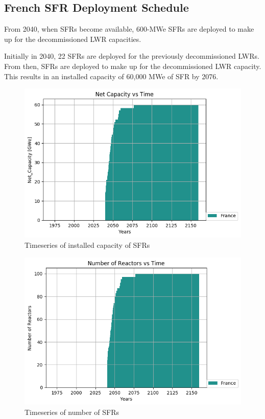 \subsection{French \gls{SFR} Deployment Schedule}

From 2040, when \gls{SFR}s become available,
600-MWe \gls{SFR}s are deployed to make up for the 
decommissioned \gls{LWR} capacities.

Initially in 2040, 22 \gls{SFR}s
are deployed for the previously decommissioned
\gls{LWR}s. From then, \glspl{SFR} are deployed to
make up for the decommissioned \gls{LWR} capacity.
This results in an installed capacity of 60,000 MWe
of \gls{SFR} by 2076.

\begin{figure}[htbp!]
        \begin{center}
                \includegraphics[scale=0.7]{./images/french-transition/power_plot.png}
        \end{center}
        \caption{Timeseries of installed capacity of \gls{SFR}s}
        \label{fig:sfr_cap}
\end{figure}


\begin{figure}[htbp!]
        \begin{center}
                \includegraphics[scale=0.7]{./images/french-transition/number_plot.png}
        \end{center}
        \caption{Timeseries of number of \gls{SFR}s}
        \label{fig:sfr_num}
\end{figure}


